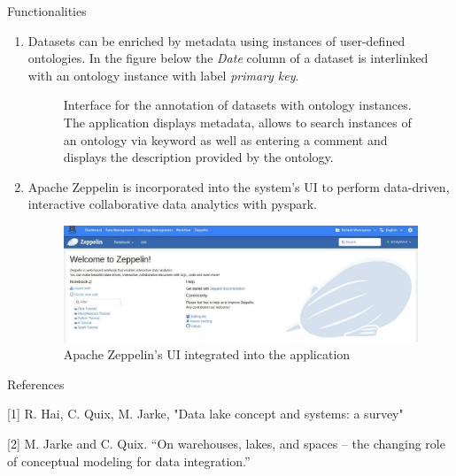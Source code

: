 \documentclass[12pt]{beamer}
\begin{document}
\begin{textblock}{0.5}
\begin{block}{Functionalities}
\begin{enumerate}
				\item Datasets can be enriched by metadata using instances of user-defined ontologies. In the figure below the \textit{Date} column of a dataset is interlinked with an ontology instance with label \textit{primary key}.
				\begin{figure}[H]
					\caption{Interface for the annotation of datasets with ontology instances. The application displays metadata, allows to search instances of an ontology via keyword as well as entering a comment and displays the description provided by the ontology.}
				\end{figure}   
				
				\item Apache Zeppelin is incorporated into the system's UI to perform data-driven,
				interactive collaborative data analytics with pyspark.
				
				\begin{figure}[H]
					\includegraphics[width=0.93\linewidth]{zeppelin.jpeg}
					\caption{Apache Zeppelin's UI integrated into the application}
				\end{figure} 
			\end{enumerate}
			
		\end{block}
		
		\vfill\vspace{7.5mm} %
		\begin{block}{References}
			\item{[1] R. Hai, C. Quix, M. Jarke, "Data lake concept and systems: a survey"}
			\item{[2] M. Jarke and C. Quix. “On warehouses, lakes, and spaces – the changing role of conceptual modeling for data integration.”}
		\end{block}
		
	\end{textblock}
	
\end{document}
